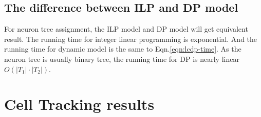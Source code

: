 \subsection{The difference between ILP and DP model}
For neuron tree assignment, the ILP model and DP model will get equivalent result. The running time for integer linear programming is exponential. And the running time for dynamic model is the same to Eqn.\ref{eqn:lcdp-time}. As the neuron tree is usually binary tree, the running time for DP is nearly linear $O(|T_1|\cdot|T_2|)$.
\section{Cell Tracking results}
